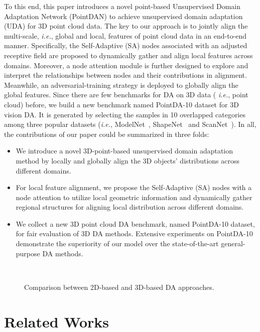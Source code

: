 \documentclass{article}
\newcommand*\ie{\textit{i.e.}}
\begin{document}
To this end, this paper introduces a novel point-based Unsupervised Domain Adaptation Network (PointDAN) to achieve unsupervised domain adaptation (UDA) for 3D point cloud data. The key to our approach is to jointly align the multi-scale, \textit{i.e.}, global and local, features of point cloud data in an end-to-end manner. Specifically, the Self-Adaptive (SA) nodes associated with an adjusted receptive field are proposed to dynamically gather and align local features across domains. Moreover, a node attention module is further designed to explore and interpret the relationships between nodes and their contributions in alignment. Meanwhile, an adversarial-training strategy is deployed to globally align the global features. Since there are few benchmarks for DA on 3D data ( \textit{i.e.}, point cloud) before, we build a new benchmark named PointDA-10 dataset for 3D vision DA. It is generated by selecting the samples in 10 overlapped categories among three popular datasets (\ie, ModelNet~\cite{wu20153d}, ShapeNet~\cite{chang2015shapenet} and ScanNet~\cite{dai2017scannet}). In all, the contributions of our paper could be summarized in three folds:
\begin{itemize}

\item We introduce a novel 3D-point-based unsupervised domain adaptation method by locally and globally align the 3D objects' distributions across different domains.
\item For local feature alignment, we propose the Self-Adaptive (SA) nodes with a node attention to utilize local geometric information and dynamically gather regional structures for aligning local distribution across different domains.
\item We collect a new 3D point cloud DA benchmark, named PointDA-10 dataset, for fair evaluation of 3D DA methods. Extensive experiments on PointDA-10 demonstrate the superiority of our model over the state-of-the-art general-purpose DA methods.
\end{itemize}


\begin{figure*}[t]
\centering
{}\\

\caption{Comparison between 2D-based and 3D-based DA approaches.}\label{f1}

\end{figure*}

\section{Related Works}\label{related}
\end{document}
